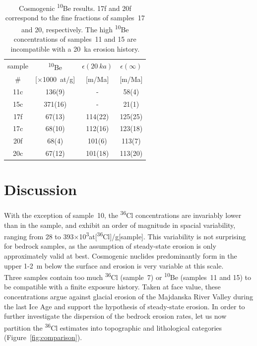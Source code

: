 \documentclass[titlepage]{article}
\begin{document}
\begin{table}[!ht]
  \centering
  \begin{tabular}{ cccc }
    \hline
    sample & \textsuperscript{10}Be &  $\epsilon(20~ka)$ &  $\epsilon(\infty)$ \\ 
    \# & [$\times$1000~at/g] & [m/Ma] & [m/Ma] \\ \hline
    11c & 136(9) & - & 58(4) \\
    15c & 371(16) & - & 21(1) \\
    17f & 67(13) & 114(22) & 125(25) \\
    17c & 68(10) & 112(16) & 123(18) \\
    20f & 68(4) & 101(6) & 113(7) \\
    20c & 67(12) & 101(18) & 113(20) \\ \hline
  \end{tabular}
  \caption{Cosmogenic \textsuperscript{10}Be results. 17f and 20f
    correspond to the fine fractions of samples~17 and 20,
    respectively. The high \textsuperscript{10}Be concentrations of
    samples~11 and 15 are incompatible with a 20~ka erosion history.}
  \label{tab:Be}
\end{table}

\section{Discussion}
\label{sec:discussion}

With the exception of sample~10, the \textsuperscript{36}Cl
concentrations are invariably lower than in the \citet{dockhorn1991}
sample, and exhibit an order of magnitude in spacial variability,
ranging from 28 to
393$\times$10\textsuperscript{3}at[\textsuperscript{36}Cl]/g[sample]. This
variability is not surprising for bedrock samples, as the assumption
of steady-state erosion is only approximately valid at
best. Cosmogenic nuclides predominantly form in the upper 1-2~m below
the surface and erosion is very variable at this scale.\\

Three samples contain too much \textsuperscript{36}Cl (sample~7) or
\textsuperscript{10}Be (samples~11 and 15) to be compatible with a
finite exposure history.  Taken at face value, these concentrations
argue against glacial erosion of the Majdanska River Valley during the
last Ice Age and support the hypothesis of steady-state erosion.  In
order to further investigate the dispersion of the bedrock erosion
rates, let us now partition the \textsuperscript{36}Cl estimates into
topographic and lithological categories
(Figure~\ref{fig:comparison}).
\end{document}
